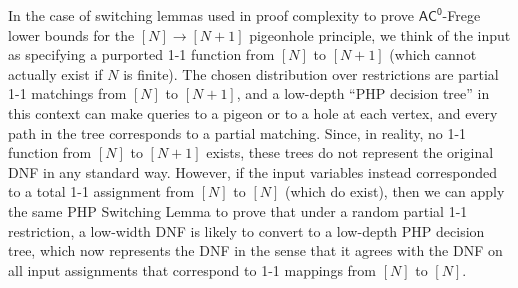 In the case of switching lemmas used in proof complexity to prove $\mathsf{AC^0}$-Frege lower bounds for the $[N] \to [N+1]$ pigeonhole principle, we think of the input as specifying a purported 1-1 function from $[N]$ to $[N+1]$ (which cannot actually 
exist if $N$ is finite).  
The chosen distribution over restrictions are partial 1-1 matchings from $[N]$ to $[N+1]$, and a low-depth ``PHP decision tree'' in this context can make queries to a pigeon or to a hole at each vertex, and every path in the tree corresponds to a partial matching. Since, in reality, no 1-1 function from $[N]$ to $[N+1]$ exists, these trees do not represent the original DNF in any standard way. However, if the input variables instead corresponded to a total 1-1 assignment from $[N]$ to $[N]$ (which do exist), then we can apply the same PHP Switching Lemma to prove that under a random partial 1-1 restriction, a low-width DNF is likely to convert to a low-depth PHP decision tree, which now represents the DNF in the sense that it agrees with the DNF on all input assignments that correspond to 1-1 mappings from $[N]$ to $[N]$. 


